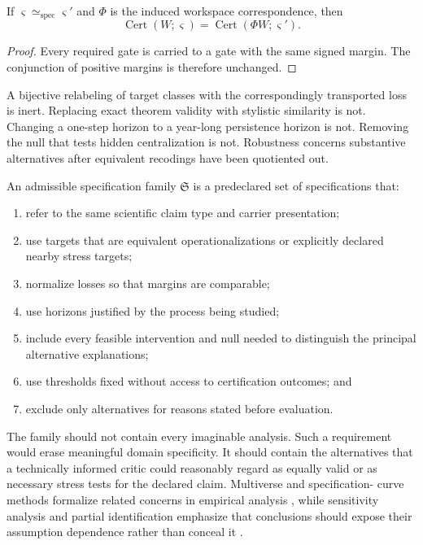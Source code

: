 \begin{proposition}
\label{prop:spec-equivalence-invariance}
If \(\varsigma\simeq_{\mathrm{spec}}\varsigma'\) and \(\Phi\) is the induced
workspace correspondence, then
\[
\operatorname{Cert}(W;\varsigma)
=
\operatorname{Cert}(\Phi W;\varsigma').
\]
\end{proposition}

\begin{proof}
Every required gate is carried to a gate with the same signed margin. The
conjunction of positive margins is therefore unchanged.
\end{proof}

A bijective relabeling of target classes with the correspondingly transported
loss is inert. Replacing exact theorem validity with stylistic similarity is
not. Changing a one-step horizon to a year-long persistence horizon is not.
Removing the null that tests hidden centralization is not. Robustness concerns
substantive alternatives after equivalent recodings have been quotiented out.


\begin{definition}
\label{def:admissible-spec-family}
An admissible specification family \(\mathfrak S\) is a predeclared set of
specifications that:
\begin{enumerate}
\item refer to the same scientific claim type and carrier presentation;
\item use targets that are equivalent operationalizations or explicitly
 declared nearby stress targets;
\item normalize losses so that margins are comparable;
\item use horizons justified by the process being studied;
\item include every feasible intervention and null needed to distinguish the
 principal alternative explanations;
\item use thresholds fixed without access to certification outcomes; and
\item exclude only alternatives for reasons stated before evaluation.
\end{enumerate}
\end{definition}

The family should not contain every imaginable analysis. Such a requirement
would erase meaningful domain specificity. It should contain the alternatives
that a technically informed critic could reasonably regard as equally valid or
as necessary stress tests for the declared claim. Multiverse and specification-
curve methods formalize related concerns in empirical analysis
\cite{SteegenEtAl2016,SimonsohnEtAl2020}, while sensitivity analysis and
partial identification emphasize that conclusions should expose their
assumption dependence rather than conceal it \cite{Leamer1983,Manski2003}.

